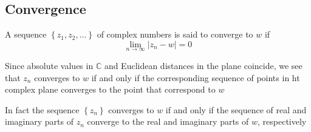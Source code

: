 \documentclass[11pt,twoside]{book}
\newcommand{\goesto}{\rightarrow}
\newcommand{\CC}{\mathbb{C}}
\newcommand{\setbraces}[1]{\left\lbrace #1 \right\rbrace}
\begin{document}
\subsection{Convergence}

A sequence $\setbraces{z_1,z_2, \ldots} $ of complex numbers is said to converge to $w$ if
\[
	\lim_{n \goesto \infty} | z_n - w | = 0 
\]

Since absolute values in $\CC$ and Euclidean distances in the plane coincide, we see that $z_n$ converges to $w$ if and only if the corresponding sequence of points in ht complex plane converges to the point that correspond to $w$

In fact the sequence $\setbraces{z_n}$ converges to $w$ if and only if the sequence of real and imaginary parts of $z_n$ converge to the real and imaginary parts of $w$, respectively
\end{document}
